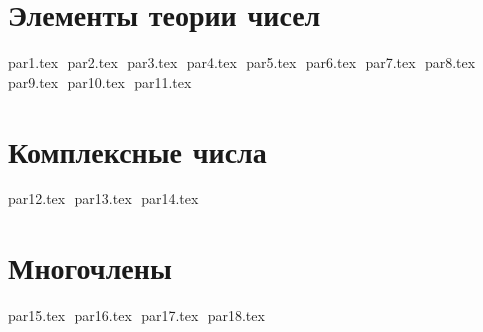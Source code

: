 



\gdef\CourseName{Алгебра}
\author{Лектор: Жуков Игорь Борисович} 
\date{}

\makefirstpages

\section*{Элементы теории чисел}

{par1.tex}
$ $
{par2.tex}
$ $
{par3.tex}
$ $
{par4.tex}
$ $
{par5.tex}
$ $
{par6.tex}
$ $
{par7.tex}
$ $
{par8.tex}
$ $
{par9.tex}
$ $
{par10.tex}
$ $
{par11.tex}
$ $
\pagebreak

\section*{Комплексные числа}

{par12.tex}
$ $
{par13.tex}
$ $
{par14.tex}
$ $
\pagebreak

\section*{Многочлены}

{par15.tex}
$ $
{par16.tex}
$ $
{par17.tex}
$ $
{par18.tex}
$ $

 